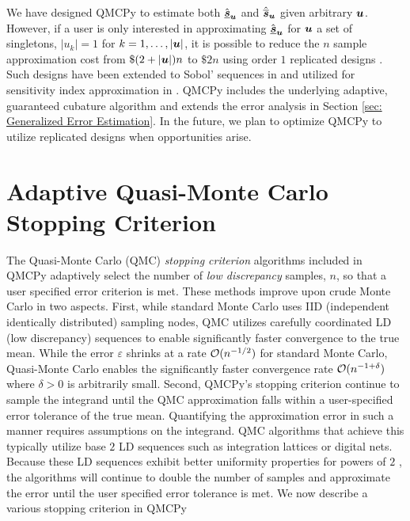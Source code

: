 \documentclass{article}
\begin{document}
We have designed QMCPy to estimate both $\hat{\underline{\boldsymbol{s}}}_{\boldsymbol{u}}$ and $\hat{\overline{\boldsymbol{s}}}_{\boldsymbol{u}}$ given arbitrary $\boldsymbol{u}$. However, if a user is only interested in approximating $\hat{\underline{\boldsymbol{s}}}_{\boldsymbol{u}}$ for $\boldsymbol{u}$ a set of singletons, $\lvert u_k \rvert = 1$ for $k=1, \dots, \lvert \boldsymbol{u} \rvert$, it is possible to reduce the $n$ sample approximation cost from $\$(2+\lvert \boldsymbol{u} \rvert)n$ to $\$2n$ using order $1$ replicated designs \cite{alex2008comparison,tissot2015randomized}. Such designs have been extended to  Sobol' sequences  in \cite{replicated_designs_sobol_seq} and utilized for sensitivity index approximation in \cite{reliable_sobol_indices_approx}. QMCPy includes the underlying adaptive, guaranteed cubature algorithm \cite{cubqmcsobol} and extends the error analysis in Section \ref{sec: Generalized Error Estimation}. In the future, we plan to optimize QMCPy to utilize replicated designs when opportunities arise.

\section{Adaptive Quasi-Monte Carlo Stopping Criterion}
\label{sec: Adaptive QMC SC}

The Quasi-Monte Carlo (QMC) \emph{stopping criterion} algorithms included in QMCPy adaptively select the number of \emph{low discrepancy} samples, $n$, so that a user specified error criterion is met. These methods improve upon crude Monte Carlo in two aspects. First, while standard Monte Carlo uses IID (independent identically distributed) sampling nodes, QMC utilizes carefully coordinated LD (low discrepancy) sequences to enable significantly faster convergence to the true mean. While the error $\varepsilon$ shrinks at a rate $\mathcal{O}(n^{-1/2})$ for standard Monte Carlo, Quasi-Monte Carlo enables the significantly faster convergence rate $\mathcal{O}(n^{-1+\delta})$ where $\delta >0$ is arbitrarily small. Second, QMCPy's stopping criterion continue to sample the integrand until the QMC approximation falls within a user-specified error tolerance of the true mean. Quantifying the approximation error in such a manner requires assumptions on the integrand. QMC algorithms that achieve this typically utilize base $2$ LD sequences such as integration lattices or digital nets. Because these LD sequences exhibit better uniformity properties for powers of $2$ , the algorithms will continue to double the number of samples and approximate the error until the user specified error tolerance is met. We now describe a various stopping criterion in QMCPy
\end{document}
